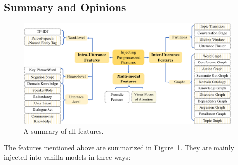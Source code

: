 \subsection{Summary and Opinions}
\begin{figure}
	\centering
	\includegraphics[scale=0.7]{fig/approach-feature.pdf}
	\caption{A summary of all features.}
	\label{fig:app-feature}
\end{figure}
The features mentioned above are summarized in 
Figure~\ref{fig:app-feature}. They are mainly {injected into vanilla models} 
in three ways: 

